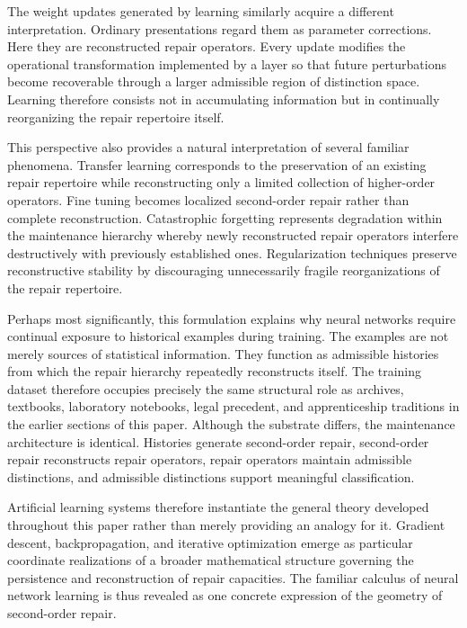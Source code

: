 \documentclass[12pt,oneside]{article}
\theoremstyle{plain}
\theoremstyle{definition}
\theoremstyle{remark}
\theoremstyle{plain}
\begin{document}
The weight updates generated by learning similarly acquire a different interpretation. Ordinary
presentations regard them as parameter corrections. Here they are reconstructed repair operators.
Every update modifies the operational transformation implemented by a layer so that future
perturbations become recoverable through a larger admissible region of distinction space. Learning
therefore consists not in accumulating information but in continually reorganizing the repair
repertoire itself.

This perspective also provides a natural interpretation of several familiar phenomena. Transfer
learning corresponds to the preservation of an existing repair repertoire while reconstructing only
a limited collection of higher-order operators. Fine tuning becomes localized second-order repair
rather than complete reconstruction. Catastrophic forgetting represents degradation within the
maintenance hierarchy whereby newly reconstructed repair operators interfere destructively with
previously established ones. Regularization techniques preserve reconstructive stability by
discouraging unnecessarily fragile reorganizations of the repair repertoire.

Perhaps most significantly, this formulation explains why neural networks require continual exposure
to historical examples during training. The examples are not merely sources of statistical
information. They function as admissible histories from which the repair hierarchy repeatedly
reconstructs itself. The training dataset therefore occupies precisely the same structural role as
archives, textbooks, laboratory notebooks, legal precedent, and apprenticeship traditions in the
earlier sections of this paper. Although the substrate differs, the maintenance architecture is
identical. Histories generate second-order repair, second-order repair reconstructs repair
operators, repair operators maintain admissible distinctions, and admissible distinctions support
meaningful classification.

Artificial learning systems therefore instantiate the general theory developed throughout this
paper rather than merely providing an analogy for it. Gradient descent, backpropagation, and
iterative optimization emerge as particular coordinate realizations of a broader mathematical
structure governing the persistence and reconstruction of repair capacities. The familiar calculus
of neural network learning is thus revealed as one concrete expression of the geometry of
second-order repair.
\end{document}
